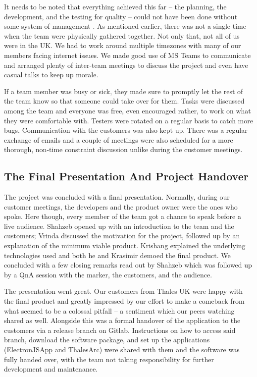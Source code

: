 \documentclass{l3proj}
\begin{document}
It needs to be noted that everything achieved this far – the planning, the development, and the testing for quality – could not have been done without some system of management \cite{management}. As mentioned earlier, there was not a single time when the team were physically gathered together. Not only that, not all of us were in the UK. We had to work around multiple timezones with many of our members facing internet issues. We made good use of MS Teams to communicate and arranged plenty of inter-team meetings to discuss the project and even have casual talks to keep up morale.

If a team member was busy or sick, they made sure to promptly let the rest of the team know so that someone could take over for them. Tasks were discussed among the team and everyone was free, even encouraged rather, to work on what they were comfortable with. Testers were rotated on a regular basis to catch more bugs. Communication with the customers was also kept up. There was a regular exchange of emails and a couple of meetings were also scheduled for a more thorough, non-time constraint discussion unlike during the customer meetings.

\subsection{The Final Presentation And Project Handover}
 
The project was concluded with a final presentation. Normally, during our customer meetings, the developers and the product owner were the ones who spoke. Here though, every member of the team got a chance to speak before a live audience. Shahzeb opened up with an introduction to the team and the customers; Vrinda discussed the motivation for the project, followed up by an explanation of the minimum viable product. Krishang explained the underlying technologies used and both he and Krasimir demoed the final product. We concluded with a few closing remarks read out by Shahzeb which was followed up by a QnA session with the marker, the customers, and the audience.

The presentation went great. Our customers from Thales UK were happy with the final product and greatly impressed by our effort to make a comeback from what seemed to be a colossal pitfall – a sentiment which our peers watching shared as well. Alongside this was a formal handover of the application to the customers via a release branch on Gitlab. Instructions on how to access said branch, download the software package, and set up the applications (ElectronJSApp and ThalesArc) were shared with them and the software was fully handed over, with the team not taking responsibility for further development and maintenance.
\end{document}
